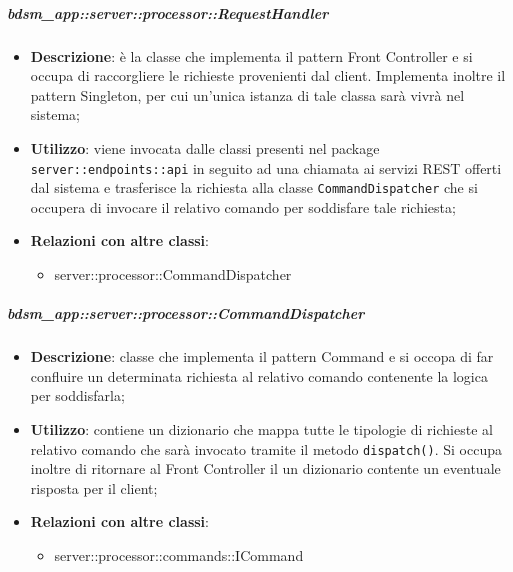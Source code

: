     \subparagraph{bdsm\_app::server::processor::RequestHandler} %
    \label{subp:bdsm_app_server_processor_requesthandler}
    \begin{itemize}
      \item \textbf{Descrizione}: è la classe che implementa il pattern Front Controller e si occupa di raccorgliere le richieste provenienti dal client. Implementa inoltre il pattern Singleton, per cui un'unica istanza di tale classa sarà vivrà nel sistema;
      \item \textbf{Utilizzo}: viene invocata dalle classi presenti nel package \texttt{server::endpoints::api} in seguito ad una chiamata ai servizi REST offerti dal sistema e trasferisce la richiesta alla classe \texttt{CommandDispatcher} che si occupera di invocare il relativo comando per soddisfare tale richiesta;
      \item \textbf{Relazioni con altre classi}:
        \begin{itemize}
          \item server::processor::CommandDispatcher
        \end{itemize}
      \end{itemize}

    \subparagraph{bdsm\_app::server::processor::CommandDispatcher} %
    \label{subp:bdsm_app_server_:processor_commanddispatcher}
    \begin{itemize}
      \item \textbf{Descrizione}: classe che implementa il pattern Command e si occopa di far confluire un determinata richiesta al relativo comando contenente la logica per soddisfarla;
      \item \textbf{Utilizzo}: contiene un dizionario che mappa tutte le tipologie di richieste al relativo comando che sarà invocato tramite il metodo \texttt{dispatch()}. Si occupa inoltre di ritornare al Front Controller il un dizionario contente un eventuale risposta per il client;
      \item \textbf{Relazioni con altre classi}:
        \begin{itemize}
          \item server::processor::commands::ICommand
        \end{itemize}
      \end{itemize}

